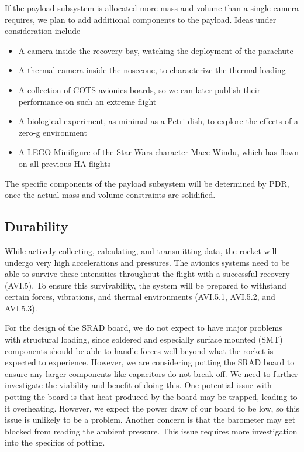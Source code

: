 If the payload subsystem is allocated more mass and volume than a single camera requires, we plan to add additional components to the payload. Ideas under consideration include

\begin{itemize}
    \item A camera inside the recovery bay, watching the deployment of the parachute
    \item A thermal camera inside the nosecone, to characterize the thermal loading
    \item A collection of COTS avionics boards, so we can later publish their performance on such an extreme flight
    \item A biological experiment, as minimal as a Petri dish, to explore the effects of a zero-g environment
    \item A LEGO Minifigure of the Star Wars character Mace Windu, which has flown on all previous HA flights
\end{itemize}

The specific components of the payload subsystem will be determined by PDR, once the actual mass and volume constraints are solidified.


\subsection{Durability}  %
While actively collecting, calculating, and transmitting data, the rocket will undergo very high accelerations and pressures. The avionics systems need to be able to survive these intensities throughout the flight with a successful recovery (AVI.5). To ensure this survivability, the system will be prepared to withstand certain forces, vibrations, and thermal environments (AVI.5.1, AVI.5.2, and AVI.5.3).

For the design of the SRAD board, we do not expect to have major problems with structural loading, since soldered and especially surface mounted (SMT) components should be able to handle forces well beyond what the rocket is expected to experience. However, we are considering potting the SRAD board to ensure any larger components like capacitors do not break off. We need to further investigate the viability and benefit of doing this. One potential issue with potting the board is that heat produced by the board may be trapped, leading to it overheating. However, we expect the power draw of our board to be low, so this issue is unlikely to be a problem. Another concern is that the barometer may get blocked from reading the ambient pressure. This issue requires more investigation into the specifics of potting.

